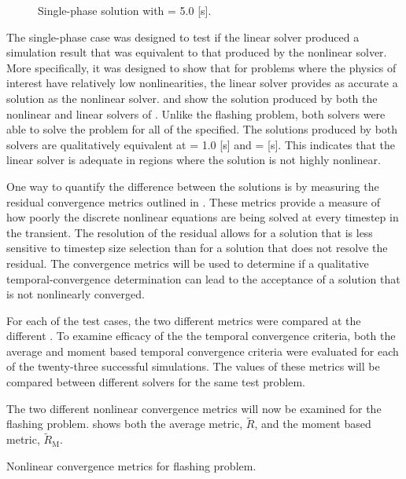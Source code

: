 \begin{figure}[h!t]
\centering

\caption{Single-phase solution with \dtmax{} = 5.0 {[s]}.}
\label{fig:single1pt000em5}
\end{figure}

The single-phase case was designed to test if the linear solver produced a simulation result that was equivalent to that produced by the nonlinear solver.
More specifically, it was designed to show that for problems where the physics of interest have relatively low nonlinearities, the linear solver provides as accurate a solution as the nonlinear solver.
 and  show the solution produced by both the nonlinear and linear solvers of \cobra{}.
Unlike the flashing problem, both solvers were able to solve the problem for all of the \dtmax{} specified.
The solutions produced by both solvers are qualitatively equivalent at \dtmax{} = 1.0 [s] and \dtmax{} =  [s].
This indicates that the linear solver is adequate in regions where the solution is not highly nonlinear.

One way to quantify the difference between the solutions is by measuring the residual convergence metrics outlined in .
These metrics provide a measure of how poorly the discrete nonlinear equations are being solved at every timestep in the transient.
The resolution of the residual allows for a solution that is less sensitive to timestep size selection than for a solution that does not resolve the residual.
The convergence metrics will be used to determine if a qualitative temporal-convergence determination can lead to the acceptance of a solution that is not nonlinearly converged.

For each of the test cases, the two different metrics were compared at the different \dtmax{}.
To examine efficacy of the the temporal convergence criteria, both the average and moment based temporal convergence criteria were evaluated for each of the twenty-three successful simulations.
The values of these metrics will be compared between different solvers for the same test problem. 

The two different nonlinear convergence metrics will now be examined for the flashing problem.
 shows both the average metric, $\tilde{R}$, and the moment based metric, $\tilde{R}_{\text{M}}$.

\begin{table}[h!t]
\centering
\singlespace

\caption{Nonlinear convergence metrics for flashing problem.}
\label{tab:flashingMetric}
\end{table}

